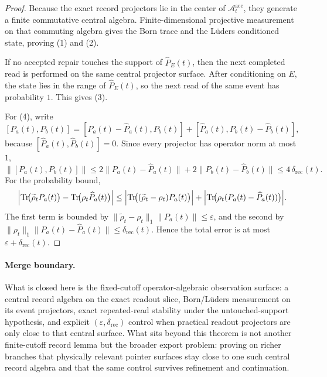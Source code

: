 \documentclass[11pt]{article}
\theoremstyle{remark}
\theoremstyle{plain}
\begin{document}
\begin{proof}
Because the exact record projectors lie in the center of \(\mathcal A_t^{\mathrm{acc}}\), they
generate a finite commutative central algebra. Finite-dimensional projective measurement on that
commuting algebra gives the Born trace and the L\"uders conditioned state, proving (1) and (2).

If no accepted repair touches the support of \(\widehat P_E(t)\), then the next completed read is
performed on the same central projector surface. After conditioning on \(E\), the state lies in
the range of \(\widehat P_E(t)\), so the next read of the same event has probability \(1\). This
gives (3).

For (4), write
\[
[P_a(t),P_b(t)]
=
[P_a(t)-\widehat P_a(t),P_b(t)]
+
[\widehat P_a(t),P_b(t)-\widehat P_b(t)],
\]
because \([\widehat P_a(t),\widehat P_b(t)]=0\). Since every projector has operator norm at most
\(1\),
\[
\|[P_a(t),P_b(t)]\|
\le
2\|P_a(t)-\widehat P_a(t)\|
+
2\|P_b(t)-\widehat P_b(t)\|
\le
4\,\delta_{\mathrm{rec}}(t).
\]
For the probability bound,
\[
\Bigl|
\operatorname{Tr}\!\bigl(\widetilde\rho_t P_a(t)\bigr)
-
\operatorname{Tr}\!\bigl(\rho_t \widehat P_a(t)\bigr)
\Bigr|
\le
\Bigl|\operatorname{Tr}\!\bigl((\widetilde\rho_t-\rho_t)P_a(t)\bigr)\Bigr|
+
\Bigl|\operatorname{Tr}\!\bigl(\rho_t(P_a(t)-\widehat P_a(t))\bigr)\Bigr|.
\]
The first term is bounded by \(\|\widetilde\rho_t-\rho_t\|_1\|P_a(t)\|\le \varepsilon\), and the
second by \(\|\rho_t\|_1\|P_a(t)-\widehat P_a(t)\|\le \delta_{\mathrm{rec}}(t)\). Hence the total
error is at most \(\varepsilon+\delta_{\mathrm{rec}}(t)\).
\end{proof}

\paragraph{Merge boundary.}
What is closed here is the fixed-cutoff operator-algebraic observation surface: a central record
algebra on the exact readout slice, Born/L\"uders measurement on its event projectors, exact
repeated-read stability under the untouched-support hypothesis, and explicit
\((\varepsilon,\delta_{\mathrm{rec}})\) control when practical readout projectors are only close
to that central surface. What sits beyond this theorem is not another finite-cutoff record
lemma but the broader export problem: proving on richer branches that physically relevant pointer
surfaces stay close to one such central record algebra and that the same control survives
refinement and continuation.
\end{document}
